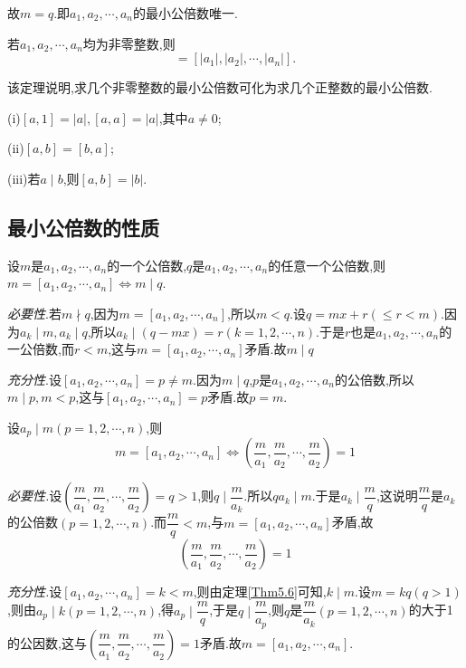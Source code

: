 故$m=q$.即$a_{1},a_{2},\cdots ,a_{n}$的最小公倍数唯一.

\theorem 若$a_{1},a_{2},\cdots,a_{n}$均为非零整数,则
\begin{equation*}
	[a_{1},a_{2},\cdots,a_{n}]=[|a_{1}|,|a_{2}|,\cdots,|a_{n}|].
\end{equation*}

该定理说明,求几个非零整数的最小公倍数可化为求几个正整数的最小公倍数.

\theorem (i)$[a,1]=|a|,[a,a]=|a|$,其中$a\neq 0$;

(ii)$[a,b]=[b,a]$;

(iii)若$a\mid b$,则$[a,b]=|b|$.

\subsection{最小公倍数的性质}
\theorem [推论1.4.3]设$m$是$a_{1},a_{2},\cdots,a_{n}$的一个公倍数,$q$是$a_{1},a_{2},\cdots,a_{n}$的任意一个公倍数,则$m=[a_{1},a_{2},\cdots,a_{n}]\Leftrightarrow m\mid q$.\label{Thm5.6}

\proof \textit{必要性}.若$m\nmid q$,因为$m=[a_{1},a_{2},\cdots,a_{n}]$,所以$m<q$.设$q=mx+r(\leqslant r<m)$.因为$a_{k}\mid m,a_{k}\mid q$,所以$a_{k}\mid(q-mx)=r(k=1,2,\cdots,n)$.于是$r$也是$a_{1},a_{2},\cdots,a_{n}$的一公倍数,而$r<m$,这与$m=[a_{1},a_{2},\cdots,a_{n}]$矛盾.故$m\mid q$

\textit{充分性}.设$[a_{1},a_{2},\cdots,a_{n}]=p\neq m$.因为$m\mid q$,$p$是$a_{1},a_{2},\cdots,a_{n}$的公倍数,所以$m\mid p,m<p$,这与$[a_{1},a_{2},\cdots,a_{n}]=p$矛盾.故$p=m$.

\theorem 设$a_{p}\mid m(p=1,2,\cdots,n)$,则
\begin{equation*}
	m=[a_{1},a_{2},\cdots,a_{n}]\Leftrightarrow\left( \frac{m}{a_{1}},\frac{m}{a_{2}},\cdots,\frac{m}{a_{2}}\right) =1
\end{equation*}\label{Thm5.7}

\proof \textit{必要性.}设$\left( \dfrac{m}{a_{1}},\dfrac{m}{a_{2}},\cdots,\dfrac{m}{a_{2}}\right) =q>1$,则$q\mid\dfrac{m}{a_{k}}$.所以$qa_{k}\mid m$.于是$a_{k}\mid\dfrac{m}{q}$,这说明$\dfrac{m}{q}$是$a_{k}$的公倍数$(p=1,2,\cdots,n)$.而$\dfrac{m}{q}<m$,与$m=[a_{1},a_{2},\cdots,a_{n}]$矛盾,故
\begin{equation*}
	\left( \frac{m}{a_{1}},\frac{m}{a_{2}},\cdots,\frac{m}{a_{2}}\right) =1
\end{equation*}

\textit{充分性.}设$[a_{1},a_{2},\cdots,a_{n}]=k<m$,则由定理\ref{Thm5.6}可知,$k\mid m$.设$m=kq(q>1)$,则由$a_{p}\mid k(p=1,2,\cdots,n)$,得$a_{p}\mid\dfrac{m}{q}$,于是$q\mid\dfrac{m}{a_{p}}$,则$q$是$\dfrac{m}{a_{k}}(p=1,2,\cdots,n)$的大于1的公因数,这与$\left( \dfrac{m}{a_{1}},\dfrac{m}{a_{2}},\cdots,\dfrac{m}{a_{2}}\right) =1$矛盾.故$m=[a_{1},a_{2},\cdots,a_{n}]$.

